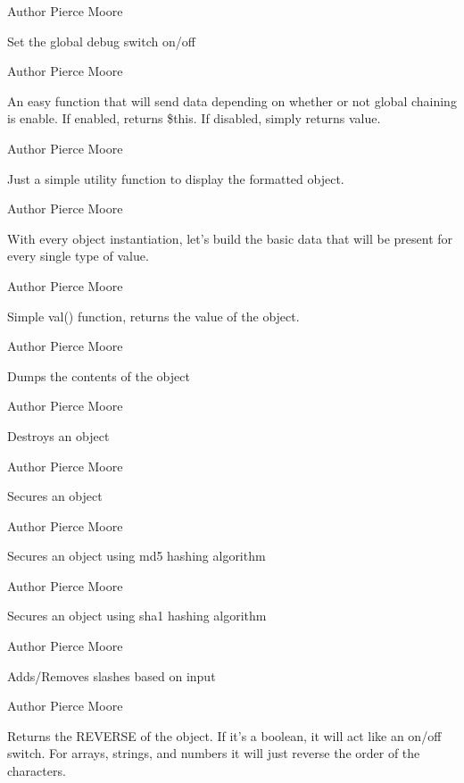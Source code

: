 \begin{DoxyAuthor}{Author}
Pierce Moore
\end{DoxyAuthor}
Set the global debug switch on/off

\begin{DoxyAuthor}{Author}
Pierce Moore
\end{DoxyAuthor}
An easy function that will send data depending on whether or not global chaining is enable. If enabled, returns \$this. If disabled, simply returns value.

\begin{DoxyAuthor}{Author}
Pierce Moore
\end{DoxyAuthor}
Just a simple utility function to display the formatted object.

\begin{DoxyAuthor}{Author}
Pierce Moore
\end{DoxyAuthor}
With every object instantiation, let's build the basic data that will be present for every single type of value.

\begin{DoxyAuthor}{Author}
Pierce Moore
\end{DoxyAuthor}
Simple val() function, returns the value of the object.

\begin{DoxyAuthor}{Author}
Pierce Moore
\end{DoxyAuthor}
Dumps the contents of the object

\begin{DoxyAuthor}{Author}
Pierce Moore
\end{DoxyAuthor}
Destroys an object

\begin{DoxyAuthor}{Author}
Pierce Moore
\end{DoxyAuthor}
Secures an object

\begin{DoxyAuthor}{Author}
Pierce Moore
\end{DoxyAuthor}
Secures an object using md5 hashing algorithm

\begin{DoxyAuthor}{Author}
Pierce Moore
\end{DoxyAuthor}
Secures an object using sha1 hashing algorithm

\begin{DoxyAuthor}{Author}
Pierce Moore
\end{DoxyAuthor}
Adds/\-Removes slashes based on input

\begin{DoxyAuthor}{Author}
Pierce Moore
\end{DoxyAuthor}
Returns the R\-E\-V\-E\-R\-S\-E of the object. If it's a boolean, it will act like an on/off switch. For arrays, strings, and numbers it will just reverse the order of the characters.

